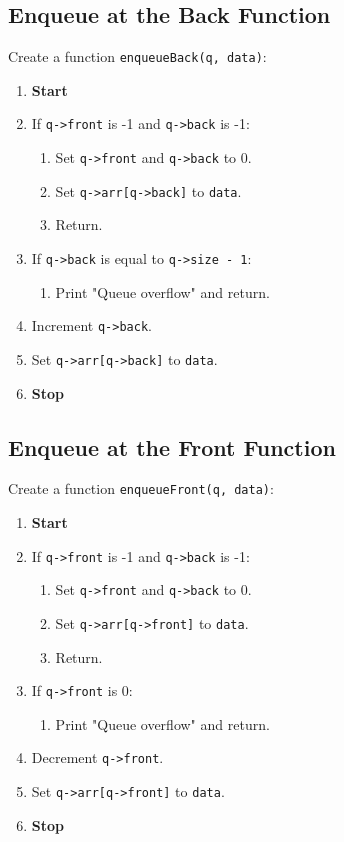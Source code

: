 {  \subsection{Enqueue at the Back Function}
  Create a function \texttt{enqueueBack(q, data)}:
  \begin{enumerate}[label=\arabic*:,left=0pt]
    \item \textbf{Start}
    \item If \texttt{q->front} is -1 and \texttt{q->back} is -1:
          \begin{enumerate}[label=2.\arabic*.]
            \item Set \texttt{q->front} and \texttt{q->back} to 0.
            \item Set \texttt{q->arr[q->back]} to \texttt{data}.
            \item Return.
          \end{enumerate}
    \item If \texttt{q->back} is equal to \texttt{q->size - 1}:
          \begin{enumerate}[label=2.\arabic*.]
            \item Print "Queue overflow" and return.
          \end{enumerate}
    \item Increment \texttt{q->back}.
    \item Set \texttt{q->arr[q->back]} to \texttt{data}.
    \item \textbf{Stop}
  \end{enumerate}

  \subsection{Enqueue at the Front Function}
  Create a function \texttt{enqueueFront(q, data)}:
  \begin{enumerate}[label=\arabic*:,left=0pt]
    \item \textbf{Start}
    \item If \texttt{q->front} is -1 and \texttt{q->back} is -1:
          \begin{enumerate}[label=2.\arabic*.]
            \item Set \texttt{q->front} and \texttt{q->back} to 0.
            \item Set \texttt{q->arr[q->front]} to \texttt{data}.
            \item Return.
          \end{enumerate}
    \item If \texttt{q->front} is 0:
          \begin{enumerate}[label=2.\arabic*.]
            \item Print "Queue overflow" and return.
          \end{enumerate}
    \item Decrement \texttt{q->front}.
    \item Set \texttt{q->arr[q->front]} to \texttt{data}.
    \item \textbf{Stop}
  \end{enumerate}

}
